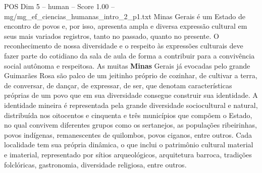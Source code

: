 \begin{textsample}{POS Dim 5 – human – Score 1.00 – mg/mg\_ef\_ciencias\_humanas\_intro\_2\_p1.txt}  \label{ex:f5_pos_001}
Minas Gerais é um Estado de encontro de povos e, por isso, apresenta ampla e diversa expressão cultural em seus mais variados registros, tanto no passado, quanto no presente.
O reconhecimento de nossa diversidade e o respeito às expressões culturais deve fazer parte do cotidiano da sala de aula de forma a contribuir para a convivência social autônoma e respeitosa.
As muitas \textbf{Minas} Gerais já evocadas pelo grande Guimarães Rosa são palco de um jeitinho próprio de cozinhar, de cultivar a terra, de conversar, de dançar, de expressar, de ser, que denotam características próprias de um povo que em sua diversidade consegue construir sua identidade.
A identidade mineira é representada pela grande diversidade sociocultural e natural, distribuída nos oitocentos e cinquenta e três municípios que compõem o Estado, no qual convivem diferentes grupos como os sertanejos, as populações ribeirinhas, povos indígenas, remanescentes de quilombos, povos ciganos, entre outros.
Cada localidade tem sua própria dinâmica, o que inclui o patrimônio cultural material e imaterial, representado por sítios arqueológicos, arquitetura barroca, tradições folclóricas, gastronomia, diversidade religiosa, entre outros.

\end{textsample}
